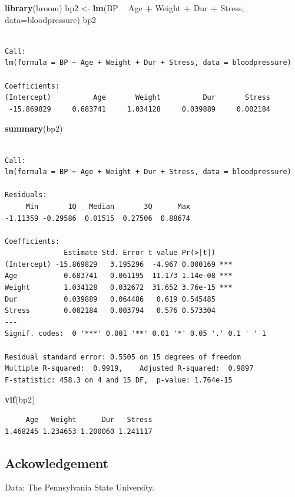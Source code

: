 \documentclass[]{article}
\newenvironment{Shaded}{\begin{snugshade}}{\end{snugshade}}
\newcommand{\DataTypeTok}[1]{\textcolor[rgb]{0.13,0.29,0.53}{#1}}
\newcommand{\KeywordTok}[1]{\textcolor[rgb]{0.13,0.29,0.53}{\textbf{#1}}}
\newcommand{\NormalTok}[1]{#1}
\newcommand{\OperatorTok}[1]{\textcolor[rgb]{0.81,0.36,0.00}{\textbf{#1}}}
\newcommand{\StringTok}[1]{\textcolor[rgb]{0.31,0.60,0.02}{#1}}
\begin{document}
\begin{Shaded}
\begin{Highlighting}[]
\KeywordTok{library}\NormalTok{(broom)}
\NormalTok{bp2 <-}\StringTok{ }\KeywordTok{lm}\NormalTok{(BP }\OperatorTok{~}\StringTok{ }\NormalTok{Age }\OperatorTok{+}\StringTok{ }\NormalTok{Weight  }\OperatorTok{+}\StringTok{ }\NormalTok{Dur  }\OperatorTok{+}\StringTok{ }\NormalTok{Stress, }\DataTypeTok{data=}\NormalTok{bloodpressure)}
\NormalTok{bp2}
\end{Highlighting}
\end{Shaded}

\begin{verbatim}

Call:
lm(formula = BP ~ Age + Weight + Dur + Stress, data = bloodpressure)

Coefficients:
(Intercept)          Age       Weight          Dur       Stress  
 -15.869829     0.683741     1.034128     0.039889     0.002184  
\end{verbatim}

\begin{Shaded}
\begin{Highlighting}[]
\KeywordTok{summary}\NormalTok{(bp2)}
\end{Highlighting}
\end{Shaded}

\begin{verbatim}

Call:
lm(formula = BP ~ Age + Weight + Dur + Stress, data = bloodpressure)

Residuals:
     Min       1Q   Median       3Q      Max 
-1.11359 -0.29586  0.01515  0.27506  0.88674 

Coefficients:
              Estimate Std. Error t value Pr(>|t|)    
(Intercept) -15.869829   3.195296  -4.967 0.000169 ***
Age           0.683741   0.061195  11.173 1.14e-08 ***
Weight        1.034128   0.032672  31.652 3.76e-15 ***
Dur           0.039889   0.064486   0.619 0.545485    
Stress        0.002184   0.003794   0.576 0.573304    
---
Signif. codes:  0 '***' 0.001 '**' 0.01 '*' 0.05 '.' 0.1 ' ' 1

Residual standard error: 0.5505 on 15 degrees of freedom
Multiple R-squared:  0.9919,    Adjusted R-squared:  0.9897 
F-statistic: 458.3 on 4 and 15 DF,  p-value: 1.764e-15
\end{verbatim}

\begin{Shaded}
\begin{Highlighting}[]
\KeywordTok{vif}\NormalTok{(bp2)}
\end{Highlighting}
\end{Shaded}

\begin{verbatim}
     Age   Weight      Dur   Stress 
1.468245 1.234653 1.200060 1.241117 
\end{verbatim}

\hypertarget{ackowledgement}{%
\subsection{Ackowledgement}\label{ackowledgement}}

Data: The Pennsylvania State University.
\end{document}
